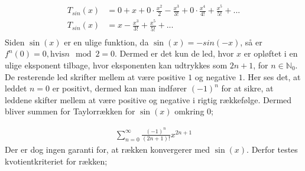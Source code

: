 \begin{align*}
T_{sin} (x) &= 0+x+0 \cdot \frac{x^2}{2}-\frac{x^3}{3!}+0 \cdot \frac{x^4}{4!}+\frac{x^5}{5!}+... 
\\
T_{sin} (x) &= x-\frac{x^3}{3!}+\frac{x^5}{5!}+... \\
\end{align*}
Siden $\sin(x)$ er en ulige funktion, da $\sin(x)=-sin(-x)$, så er $f^{n}(0)=0, \text{hvis} n \mod 2=0$. Dermed er det kun de led, hvor $x$ er opløftet i en ulige eksponent tilbage, hvor eksponenten kan udtrykkes som $2n+1$, for $n\in \mathbb{N}_0$. De resterende led skrifter mellem at være positive $1$ og negative $1$. Her ses det, at leddet $n=0$ er positivt, dermed kan man indfører $(-1)^n$ for at sikre, at leddene skifter mellem at være positive og negative i rigtig rækkefølge. Dermed bliver summen for Taylorrækken for $\sin(x)$ omkring $0$;


\begin{align*}
\sum_{n=0}^{\infty} \frac{(-1)^n}{(2n+1)!}x^{2n+1}
\end{align*}
Der er dog ingen garanti for, at rækken konvergerer med $\sin(x)$. Derfor testes kvotientkriteriet for rækken;

